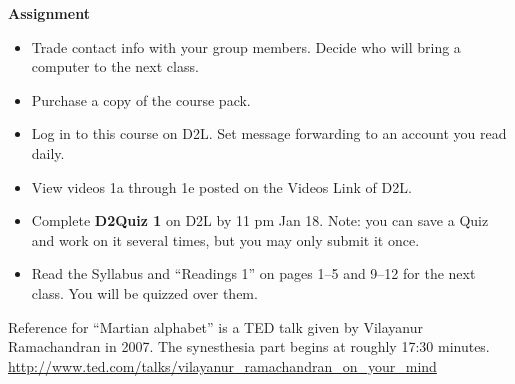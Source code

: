 {\bf Assignment}
\begin{itemize}
\item  Trade contact info with your group members.  Decide who will
  bring a computer to the next class.
\item   Purchase a copy of the course pack.
\item   Log in to this course on D2L. Set message forwarding to an
  account you read daily.
\item View videos 1a through 1e posted on the Videos Link of D2L.
\item Complete {\bf D2Quiz 1} on D2L by 11 pm Jan 18.  Note: you can
  save a Quiz and work on it several times, but you may only submit it
  once. %
\item Read the Syllabus and ``Readings 1'' on pages 1--5 and 9--12 for
  the next class. You will be quizzed over them. 
\end{itemize}


Reference for ``Martian alphabet'' is a TED talk given by Vilayanur
Ramachandran in 2007. The synesthesia part begins at roughly 17:30 minutes.
\url{http://www.ted.com/talks/vilayanur_ramachandran_on_your_mind}